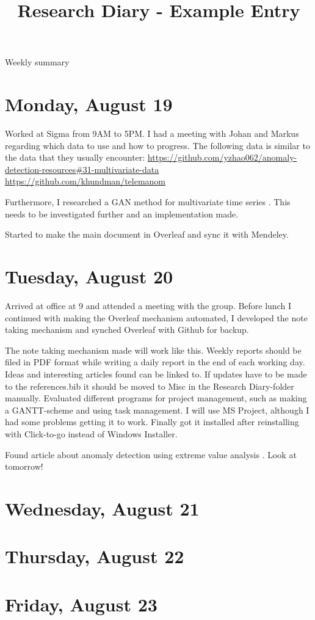 \documentclass[11pt,letterpaper]{article}
\begin{document}
\univlogo

\title{Research Diary - Example Entry}

{\Huge Weekly summary}\\[5mm]

\section*{Monday, August 19}
Worked at Sigma from 9AM to 5PM. I had a meeting with Johan and Markus regarding which data to use and how to progress. The following data is similar to the data that they usually encounter: \newline
\url{https://github.com/yzhao062/anomaly-detection-resources#31-multivariate-data} \newline
\url{https://github.com/khundman/telemanom}

Furthermore, I researched a GAN method for multivariate time series \cite{Li2019a}. This needs to be investigated further and an implementation made.

Started to make the main document in Overleaf and sync it with Mendeley.

\section*{Tuesday, August 20}

Arrived at office at 9 and attended a meeting with the group. Before lunch I continued with making the Overleaf mechanism automated, I developed the note taking mechanism and synched Overleaf with Github for backup.   

The note taking mechanism made will work like this. Weekly reports should be filed in PDF format while writing a daily report in the end of each working day. Ideas and interesting articles found can be linked to. If updates have to be made to the references.bib it should be moved to Misc in the Research Diary-folder manually.   
Evaluated different programs for project management, such as making a GANTT-scheme and using task management. I will use MS Project, although I had some problems getting it to work. Finally got it installed after reinstalling with Click-to-go instead of Windows Installer.

Found article about anomaly detection using extreme value analysis 
. Look at tomorrow!


\section*{Wednesday, August 21}

\section*{Thursday, August 22}

\section*{Friday, August 23}


\printbibliography 
\end{document}
